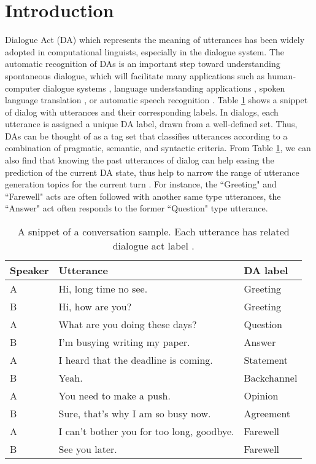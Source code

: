 \documentclass[conference]{IEEEtran}
\begin{document}
	\section{Introduction}
Dialogue Act (DA) which represents the meaning of utterances has been widely adopted in computational linguists, especially in the dialogue system. The automatic recognition of DAs is an important step toward understanding spontaneous dialogue, which will facilitate many applications such as human-computer dialogue systems \cite{traum1999speech}, language understanding applications \cite{ezen2015understanding}, spoken language translation \cite{reithinger1996predicting}, or automatic speech recognition \cite{stolcke2000dialogue}. Table \ref{table:dataset} shows a snippet of dialog with utterances and their corresponding labels. In dialogs, each utterance is assigned a unique DA label, drawn from a well-defined set. Thus, DAs can be thought of as a tag set that classifies utterances according to a combination of pragmatic, semantic, and syntactic criteria.
	From Table \ref{table:dataset}, we can also find that knowing the past utterances of dialog can help easing the prediction of the current DA state, thus help to narrow the range of utterance generation topics for the current turn \cite{chen2018dialogue}. For instance, the ``Greeting" and ``Farewell" acts are often followed with another same type utterances, the ``Answer" act often responds to the former ``Question" type utterance. 
	\begin{table}[!t]
		\centering
		\begin{tabular}{lll}
			\hline
			\textbf{Speaker}&\textbf{Utterance}&\textbf{DA label}\\
			\hline
			A & Hi, long time no see. & Greeting \\
			B & Hi, how are you? & Greeting \\
			A & What are you doing these days? &Question \\
			B & I'm busying writing my paper. &Answer \\
			A & I heard that the deadline is coming. &Statement \\
			B & Yeah. &Backchannel \\
			A & You need to make a push.&Opinion \\
			B & Sure, that’s why I am so busy now. &Agreement \\
			A & I can't bother you for too long, goodbye. &Farewell \\
			B &See you later.&Farewell \\
			\hline
		\end{tabular}
		\caption{A snippet of a conversation sample. Each utterance has related dialogue act label \cite{chen2018dialogue}.}
		\label{table:dataset}
	\end{table}
	
\end{document}
